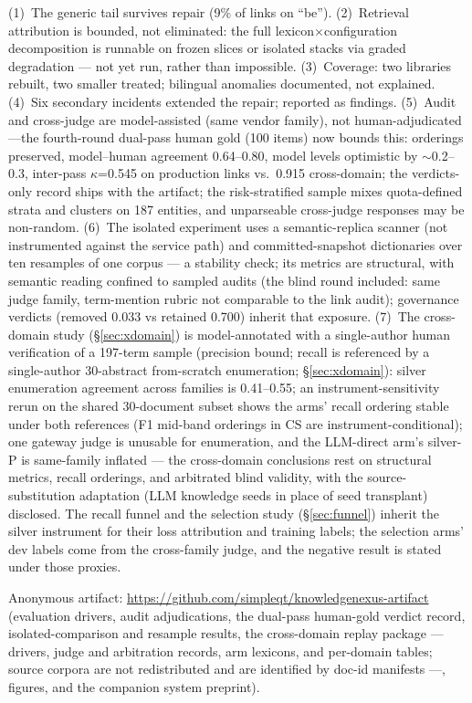 \documentclass[sigconf,nonacm,anonymous]{acmart}
\begin{document}
(1)~The generic tail survives repair (9\% of links on ``be'').
(2)~Retrieval attribution is bounded, not eliminated: the full
lexicon$\times$configuration decomposition is runnable on frozen slices
or isolated stacks via graded degradation --- not yet run, rather than
impossible. (3)~Coverage: two libraries rebuilt, two smaller
treated; bilingual anomalies documented, not explained. (4)~Six
secondary incidents extended the repair; reported as findings.
(5)~Audit and cross-judge are model-assisted (same vendor family), not
human-adjudicated---the fourth-round dual-pass human gold (100 items)
now bounds this: orderings preserved, model--human agreement
0.64--0.80, model levels optimistic by ${\sim}$0.2--0.3, inter-pass
$\kappa$=0.545 on production links vs.\ 0.915 cross-domain; the
verdicts-only record ships with the artifact; the risk-stratified
sample mixes quota-defined strata
and clusters on 187 entities, and unparseable cross-judge responses may
be non-random. (6)~The isolated experiment uses a semantic-replica
scanner (not instrumented against the service path) and
committed-snapshot dictionaries over ten resamples of one corpus --- a
stability check; its metrics are structural,
with semantic reading confined to sampled audits (the blind
round included: same judge family, term-mention rubric not
comparable to the link audit); governance verdicts (removed 0.033 vs
retained 0.700) inherit that exposure. (7)~The cross-domain study
(\S\ref{sec:xdomain}) is model-annotated with a
single-author human verification of a 197-term sample (precision
bound; recall is referenced by a single-author 30-abstract
from-scratch enumeration; \S\ref{sec:xdomain}): silver enumeration
agreement across families is 0.41--0.55; an instrument-sensitivity
rerun on the shared 30-document subset shows the arms' recall ordering
stable under both references (F1 mid-band orderings in CS are
instrument-conditional); one
gateway judge is unusable for enumeration, and the LLM-direct arm's
silver-P is same-family inflated --- the cross-domain conclusions rest
on structural metrics, recall orderings, and arbitrated blind validity,
with the
source-substitution adaptation (LLM knowledge seeds in place of seed
transplant) disclosed. The recall funnel and the selection study
(\S\ref{sec:funnel}) inherit the silver instrument for their loss
attribution and training labels; the selection arms' dev labels come
from the cross-family judge, and the negative result is stated under
those proxies.

\begin{acks}
Anonymous artifact: \url{https://github.com/simpleqt/knowledgenexus-artifact}
(evaluation drivers, audit adjudications, the dual-pass human-gold
verdict record, isolated-comparison and
resample results, the cross-domain replay package --- drivers, judge
and arbitration records, arm lexicons, and per-domain tables; source
corpora are not redistributed and are identified by doc-id manifests
---, figures, and the companion system preprint).
\end{acks}
\end{document}
